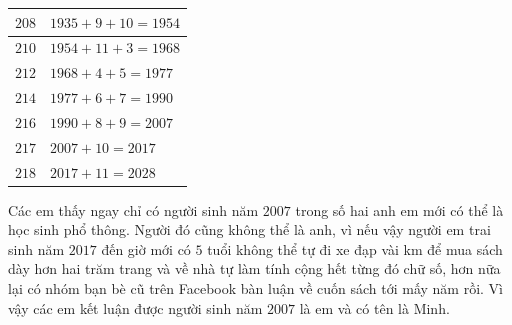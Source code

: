 \begin{multicols}{2}
\begin{table}[H]
\begin{tabular}{|l|l|}
			$208$&	$1935+9+10=1954$\\
			\hline
			$210$&	$1954+11+3=1968$\\
			\hline
			$212$&	$1968+4+5=1977$\\
			\hline
			$214$&	$1977+6+7=1990$\\
			\hline
			$216$&	$1990+8+9=2007$\\
			\hline
			$217$&	$2007+10=2017$\\
			\hline
			$218$&	$2017+11=2028$\\
			\hline
		\end{tabular}
		\vspace*{-5pt}
	\end{table}
	Các em thấy ngay chỉ có người sinh năm $2007$ trong số hai anh em mới có thể là học sinh phổ thông. Người đó cũng không thể là anh, vì nếu vậy người em trai sinh năm $2017$ đến giờ mới có $5$ tuổi không thể tự đi xe đạp vài km để mua sách dày hơn hai trăm trang và về nhà tự làm tính cộng hết từng đó chữ số, hơn nữa lại có nhóm bạn bè cũ trên Facebook bàn luận về cuốn sách tới mấy năm rồi. Vì vậy các em kết luận được người sinh năm $2007$ là em và có tên là Minh.
\end{multicols}
\newpage
\begingroup
\thispagestyle{toancuabinone}
